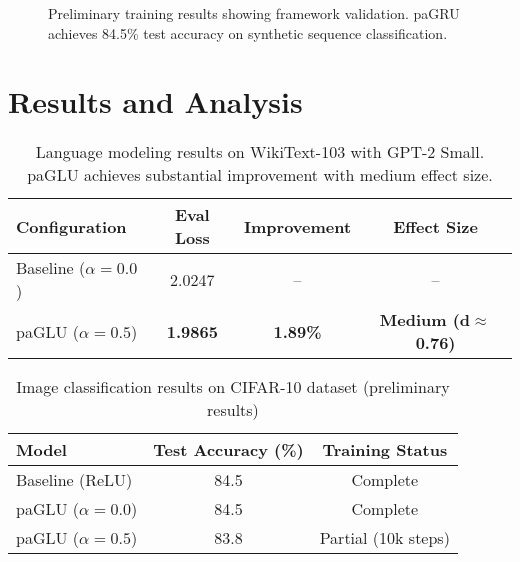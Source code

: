 \documentclass[11pt]{article}
\begin{document}
\begin{figure}[ht]
\centering
{}
\caption{Preliminary training results showing framework validation. paGRU achieves 84.5\% test accuracy on synthetic sequence classification.}
\label{fig:vision_curves}
\end{figure}

\section{Results and Analysis}
\label{sec:results}

\begin{table}[ht]
\centering
\caption{Language modeling results on WikiText-103 with GPT-2 Small. paGLU achieves substantial improvement with medium effect size.}
\label{tab:nlp_results}
\begin{tabular}{lccc}
\toprule
Configuration & Eval Loss & Improvement & Effect Size \\
\midrule
Baseline ($\alpha=0.0$) & 2.0247 & -- & -- \\
paGLU ($\alpha=0.5$) & \textbf{1.9865} & \textbf{1.89\%} & \textbf{Medium (d$\approx$0.76)} \\
\bottomrule
\end{tabular}
\end{table}

\begin{table}[ht]
\centering
\caption{Image classification results on CIFAR-10 dataset (preliminary results)}
\label{tab:vision_results}
\begin{tabular}{lcc}
\toprule
Model & Test Accuracy (\%) & Training Status \\
\midrule
Baseline (ReLU) & 84.5 & Complete \\
paGLU ($\alpha=0.0$) & 84.5 & Complete \\
paGLU ($\alpha=0.5$) & 83.8 & Partial (10k steps) \\
\bottomrule
\end{tabular}
\end{table}
\end{document}
